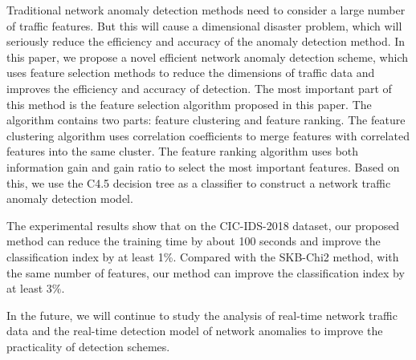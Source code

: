 \documentclass{ieeeaccess}
\theoremstyle{definition}
\begin{document}
Traditional network anomaly detection methods need to consider a large number of traffic features. 
But this will cause a dimensional disaster problem, which will seriously reduce the efficiency and accuracy of the anomaly detection method. 
In this paper, we propose a novel efficient network anomaly detection scheme, which uses feature selection methods to reduce the dimensions of traffic data and improves the efficiency and accuracy of detection. 
The most important part of this method is the feature selection algorithm proposed in this paper. The algorithm contains two parts: feature clustering and feature ranking. The feature clustering algorithm uses correlation coefficients to merge features with correlated features into the same cluster. The feature ranking algorithm uses both information gain and gain ratio to select the most important features. Based on this, we use the C4.5 decision tree as a classifier to construct a network traffic anomaly detection model.

The experimental results show that on the CIC-IDS-2018 dataset, our proposed method can reduce the training time by about 100 seconds and improve the classification index by at least 1\%. Compared with the SKB-Chi2 method, with the same number of features, our method can improve the classification index by at least 3\%.

In the future, we will continue to study the analysis of real-time network traffic data and the real-time detection model of network anomalies to improve the practicality of detection schemes.
\end{document}
